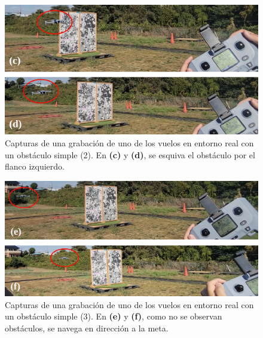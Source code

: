 \begin{figure}[H]
    \centering
    \includegraphics[scale=0.255]{partes/ImgJoao/real-1-single-3-frames-2.png}
    \caption[Capturas de una grabación de uno de los vuelos en entorno real con un obstáculo simple (2).]{Capturas de una grabación de uno de los vuelos en entorno real con un obstáculo simple (2). En \textbf{(c)} y \textbf{(d)}, se esquiva el obstáculo por el flanco izquierdo.}
    \label{real-1-single-3-frames-2}
\end{figure}

\begin{figure}[H]
    \centering
    \includegraphics[scale=0.245]{partes/ImgJoao/real-1-single-3-frames-3.png}
    \caption[Capturas de una grabación de uno de los vuelos en entorno real con un obstáculo simple (3).]{Capturas de una grabación de uno de los vuelos en entorno real con un obstáculo simple (3). En \textbf{(e)} y \textbf{(f)}, como no se observan obstáculos, se navega en dirección a la meta.}
    \label{real-1-single-3-frames-3}
\end{figure}

